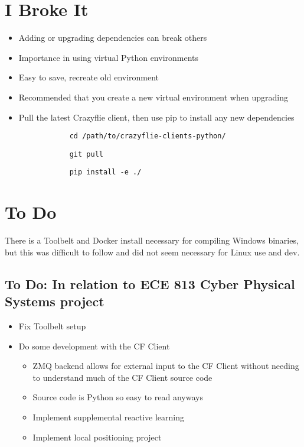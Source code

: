 \documentclass[12pt]{article}
\begin{document}
\section{I Broke It}
	\begin{itemize}
		\item Adding or upgrading dependencies can break others
		\item Importance in using virtual Python environments
		\item Easy to save, recreate old environment
		\item Recommended that you create a new virtual environment when upgrading
		\item Pull the latest Crazyflie client, then use pip to install any new dependencies
			\begin{verbatim}
			cd /path/to/crazyflie-clients-python/
			\end{verbatim}
			\begin{verbatim}
			git pull
			\end{verbatim}
			\begin{verbatim}
			pip install -e ./
			\end{verbatim}
      \end{itemize}

\section{To Do}
There is a Toolbelt and Docker install necessary for compiling Windows binaries, but this was difficult to follow and did not seem necessary for Linux use and dev.

\subsection{To Do: In relation to ECE 813 Cyber Physical Systems project}
	\begin{itemize}
		\item Fix Toolbelt setup
		\item Do some development with the CF Client
		\begin{itemize}
			\item ZMQ backend allows for external input to the CF Client without needing to understand much of the CF Client source code
			\item Source code is Python so easy to read anyways
			\item Implement supplemental reactive learning
			\item Implement local positioning project
		\end{itemize}
	\end{itemize}
\end{document}
